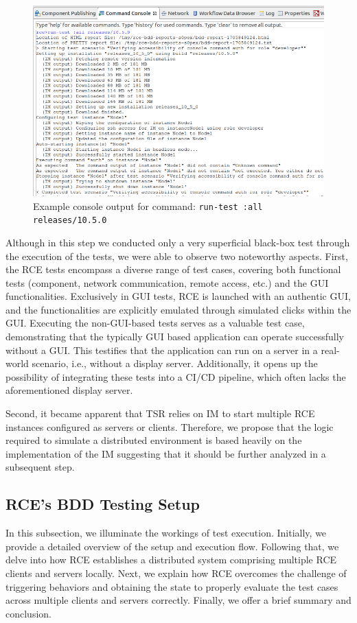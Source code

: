 \begin{figure}
    \centering
    \includegraphics[width=\linewidth]{files/figures/rce-execute-tests.png}
    \caption{Example console output for command: \texttt{run-test :all releases/10.5.0}}
    \label{fig:rce-test-output}
\end{figure}


Although in this step we conducted only a very superficial black-box test through the execution of the tests, we were able to observe two noteworthy aspects. First, the \ac{RCE} tests encompass a diverse range of test cases, covering both functional tests (component, network communication, remote access, etc.) and the \ac{GUI} functionalities. Exclusively in \ac{GUI} tests, \ac{RCE} is launched with an authentic \ac{GUI}, and the functionalities are explicitly emulated through simulated clicks within the \ac{GUI}.
Executing the non-\acs{GUI}-based tests serves as a valuable test case, demonstrating that the typically \acs{GUI} based application can operate successfully without a \acs{GUI}. This testifies that the application can run on a server in a real-world scenario, i.e., without a display server. Additionally, it opens up the possibility of integrating these tests into a CI/CD pipeline, which often lacks the aforementioned display server.

Second, it became apparent that \ac{TSR} relies on \ac{IM} to start multiple \ac{RCE} instances configured as servers or clients. Therefore, we propose that the logic required to simulate a distributed environment is based heavily on the implementation of the \ac{IM} suggesting that it should be further analyzed in a subsequent step.

\subsection{\ac{RCE}'s BDD Testing Setup}
\label{subsec:BuiltinBDDTest}
In this subsection, we illuminate the workings of test execution. Initially, we provide a detailed overview of the setup and execution flow. Following that, we delve into how \ac{RCE} establishes a distributed system comprising multiple \ac{RCE} clients and servers locally. Next, we explain how \ac{RCE} overcomes the challenge of triggering behaviors and obtaining the state to properly evaluate the test cases across multiple clients and servers correctly. Finally, we offer a brief summary and conclusion.

